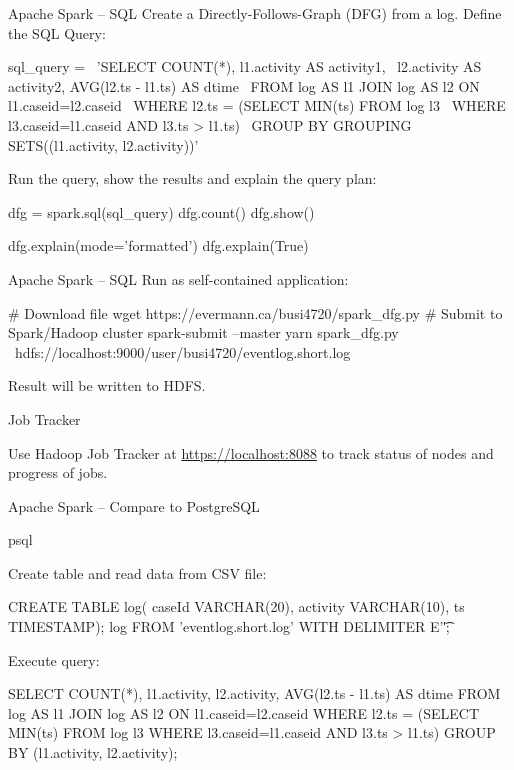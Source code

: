 \documentclass[ignorenonframetext,xcolor=x11names]{beamer}
\begin{document}
\begin{frame}[label=withcode,fragile]{Apache Spark -- SQL}
Create a Directly-Follows-Graph (DFG) from a log. Define the SQL Query:
\begin{pythoncode}
sql_query = \
'SELECT COUNT(*), l1.activity AS activity1, \
 l2.activity AS activity2, AVG(l2.ts - l1.ts) AS dtime \
  FROM log AS l1 JOIN log AS l2 ON l1.caseid=l2.caseid \
   WHERE l2.ts = (SELECT MIN(ts) FROM log l3 \
    WHERE l3.caseid=l1.caseid AND l3.ts > l1.ts) \
     GROUP BY GROUPING SETS((l1.activity, l2.activity))'
\end{pythoncode}
Run the query, show the results and explain the query plan:
\begin{pythoncode}
dfg = spark.sql(sql_query)
dfg.count()
dfg.show()

dfg.explain(mode='formatted')
dfg.explain(True)
\end{pythoncode}
\end{frame}

\begin{frame}[label=withcode,fragile]{Apache Spark -- SQL}
Run as self-contained application:
\begin{bashcode}
# Download file
wget https://evermann.ca/busi4720/spark_dfg.py
# Submit to Spark/Hadoop cluster
spark-submit --master yarn spark_dfg.py \
 hdfs://localhost:9000/user/busi4720/eventlog.short.log
\end{bashcode}
Result will be written to HDFS. \\

\begin{block}{Job Tracker}
\begin{center}
Use Hadoop Job Tracker at \url{https://localhost:8088} to track status of nodes and progress of jobs.
\end{center}
\end{block}
\end{frame}

\begin{frame}[label=withcode,fragile]{Apache Spark -- Compare to PostgreSQL}
\begin{bashcode}
psql
\end{bashcode}
Create table and read data from CSV file:
\begin{sqlcode}
CREATE TABLE log(
  caseId VARCHAR(20), 
  activity VARCHAR(10), 
  ts TIMESTAMP);
\COPY log FROM 'eventlog.short.log' 
  WITH DELIMITER E'\t';
\end{sqlcode}
Execute query:
\begin{sqlcode}
SELECT COUNT(*), l1.activity, l2.activity, 
 AVG(l2.ts - l1.ts) AS dtime 
  FROM log AS l1 JOIN log AS l2 ON l1.caseid=l2.caseid 
   WHERE l2.ts = (SELECT MIN(ts) FROM log l3 
    WHERE l3.caseid=l1.caseid AND l3.ts > l1.ts) 
     GROUP BY (l1.activity, l2.activity);
\end{sqlcode}
\end{frame}
\end{document}
